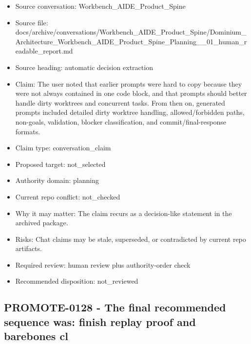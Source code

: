 \documentclass[11pt,a4paper]{report}
\begin{document}
\begin{itemize}
\item Source conversation: Workbench\_AIDE\_Product\_Spine
\item Source file: docs/archive/conversations/Workbench\_AIDE\_Product\_Spine/Dominium\_Architecture\_Workbench\_AIDE\_Product\_Spine\_Planning\_\_01\_human\_readable\_report.md
\item Source heading: automatic decision extraction
\item Claim: The user noted that earlier prompts were hard to copy because they were not always contained in one code block, and that prompts should better handle dirty worktrees and concurrent tasks. From then on, generated prompts included detailed dirty worktree handling, allowed/forbidden paths, non-goals, validation, blocker classification, and commit/final-response formats.
\item Claim type: conversation\_claim
\item Proposed target: not\_selected
\item Authority domain: planning
\item Current repo conflict: not\_checked
\item Why it may matter: The claim recurs as a decision-like statement in the archived package.
\item Risks: Chat claims may be stale, superseded, or contradicted by current repo artifacts.
\item Required review: human review plus authority-order check
\item Recommended disposition: not\_reviewed
\end{itemize}

\subsection{PROMOTE-0128 - The final recommended sequence was: finish replay proof and barebones cl}
\end{document}
